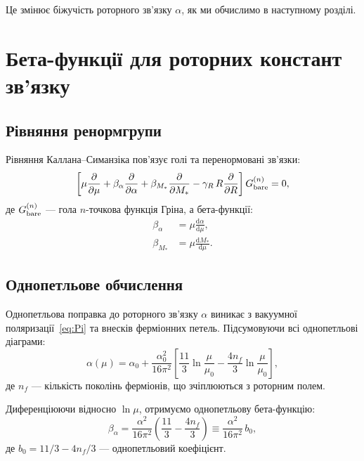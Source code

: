 \documentclass[11pt,a4paper]{article}
\numberwithin{equation}{section}
\theoremstyle{plain}
\theoremstyle{definition}
\theoremstyle{remark}
\newcommand{\dd}{\mathrm{d}}
\begin{document}
Це змінює біжучість роторного зв'язку $\alpha$, як ми обчислимо в наступному розділі.

\vspace{1em}

\section{Бета-функції для роторних констант зв'язку}\label{sec:beta}

\subsection{Рівняння ренормгрупи}

Рівняння Каллана–Симанзіка пов'язує голі та перенормовані зв'язки:
\begin{equation}
\left[\mu\frac{\partial}{\partial\mu} + \beta_\alpha\frac{\partial}{\partial\alpha} + \beta_{M_*}\frac{\partial}{\partial M_*} - \gamma_R\,R\frac{\partial}{\partial R}\right]G_{\rm bare}^{(n)} = 0,
\label{eq:CS-eqn}
\end{equation}
де $G_{\rm bare}^{(n)}$ — гола $n$-точкова функція Гріна, а бета-функції:
\begin{align}
\beta_\alpha &= \mu\frac{\dd\alpha}{\dd\mu}, \label{eq:beta-alpha-def}\\
\beta_{M_*} &= \mu\frac{\dd M_*}{\dd\mu}. \label{eq:beta-M-def}
\end{align}

\subsection{Однопетльове обчислення}

Однопетльова поправка до роторного зв'язку $\alpha$ виникає з вакуумної поляризації~\eqref{eq:Pi} та внесків ферміонних петель. Підсумовуючи всі однопетльові діаграми:
\begin{equation}
\alpha(\mu) = \alpha_0 + \frac{\alpha_0^2}{16\pi^2}\left[\frac{11}{3}\ln\frac{\mu}{\mu_0} - \frac{4n_f}{3}\ln\frac{\mu}{\mu_0}\right],
\label{eq:alpha-1loop}
\end{equation}
де $n_f$ — кількість поколінь ферміонів, що зчіплюються з роторним полем.

Диференціюючи відносно $\ln\mu$, отримуємо однопетльову бета-функцію:
\begin{equation}
\beta_\alpha = \frac{\alpha^2}{16\pi^2}\left(\frac{11}{3} - \frac{4n_f}{3}\right) \equiv \frac{\alpha^2}{16\pi^2}\,b_0,
\label{eq:beta-alpha-1loop-final}
\end{equation}
де $b_0 = 11/3 - 4n_f/3$ — однопетльовий коефіцієнт.
\end{document}
